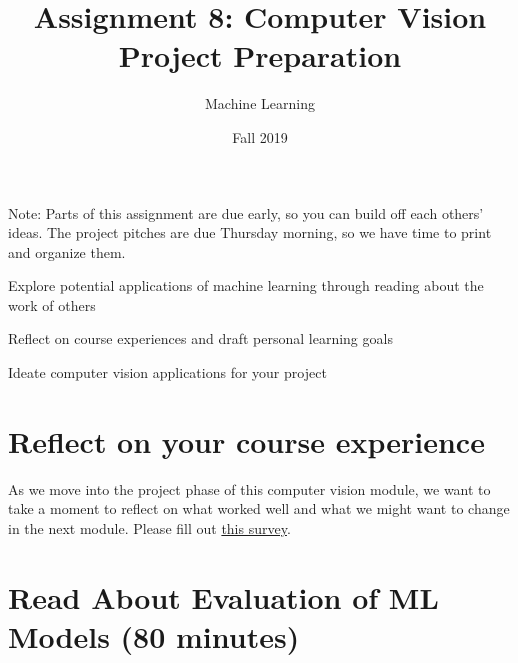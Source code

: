 \documentclass[assignment08_Solutions]{subfiles}
\title{Assignment 8: Computer Vision Project Preparation}
\author{Machine Learning}
\date{Fall 2019}
\begin{document}
\maketitle
\thispagestyle{firstpage}

Note: Parts of this assignment are due early, so you can build off each others' ideas. The project pitches are due Thursday morning, so we have time to print and organize them.
\vspace{2em}



\begin{learningobjectives}
\bi
\item Explore potential applications of machine learning through reading about the work of others
\item Reflect on course experiences and draft personal learning goals
\item Ideate computer vision applications for your project
\ei
\end{learningobjectives}


\section{Reflect on your course experience}

\begin{exercise}[(20 minutes)]
As we move into the project phase of this computer vision module, we want to take a moment to reflect on what worked well and what we might want to change in the next module. Please fill out \href{https://docs.google.com/forms/d/e/1FAIpQLScDaQrPQU8JprMdVAfXiR7LKJ0sndNgP-7foBCK347pxbVOxg/viewform}{this survey}.
\end{exercise}
 


\section{Read About Evaluation of ML Models (80 minutes)}
\end{document}
